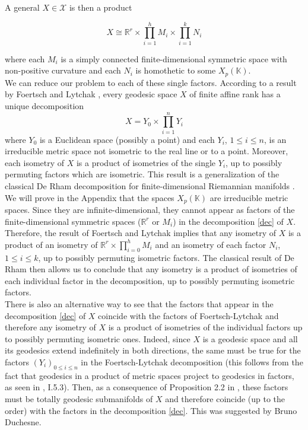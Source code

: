 \documentclass{article}
\theoremstyle{definition}
\theoremstyle{remark}
\theoremstyle{plain}
\begin{document}
A general $X\in\mathcal{X}$ is then a product

\setcounter{equation}{0}
\begin{equation} \label{dec}
    X\cong \mathbb{R}^r\times\prod_{i=1}^{h}{M_i}\times\prod_{i=1}^{k}{N_i}
\end{equation}

where each $M_i$ is a simply connected finite-dimensional symmetric space with non-positive curvature and each $N_i$ is homothetic to some $X_p(\mathbb{K})$. \\

We can reduce our problem to each of these single factors. According to a result by Foertsch and Lytchak \cite{foly}, every geodesic space $X$ of finite affine rank has a unique decomposition $$X=Y_0\times\prod_{i=1}^{n}{Y_i}$$ where $Y_0$ is a Euclidean space (possibly a point) and each $Y_i$, $1\leq i\leq n$, is an irreducible metric space not isometric to the real line or to a point. Moreover, each isometry of $X$ is a product of isometries of the single $Y_i$, up to possibly permuting factors which are isometric. This result is a generalization of the classical De Rham decomposition for finite-dimensional Riemannian manifolds \cite{derham}. \\

We will prove in the Appendix that the spaces $X_p(\mathbb{K})$ are irreducible metric spaces. Since they are infinite-dimensional, they cannot appear as factors of the finite-dimensional symmetric spaces ($\mathbb{R}^r$ or $M_i$) in the decomposition \eqref{dec} of $X$. Therefore, the result of Foertsch and Lytchak implies that any isometry of $X$ is a product of an isometry of $\mathbb{R}^r\times\prod_{i=0}^{h}{M_i}$ and an isometry of each factor $N_i$, $1\leq i\leq k$, up to possibly permuting isometric factors. The classical result of De Rham then allows us to conclude that any isometry is a product of isometries of each individual factor in the decomposition, up to possibly permuting isometric factors. \\

There is also an alternative way to see that the factors that appear in the decomposition \eqref{dec} of $X$ coincide with the factors of Foertsch-Lytchak and therefore any isometry of $X$ is a product of isometries of the individual factors up to possibly permuting isometric ones. Indeed, since $X$ is a geodesic space and all its geodesics extend indefinitely in both directions, the same must be true for the factors $(Y_i)_{0\leq i\leq n}$ in the Foertsch-Lytchak decomposition (this follows from the fact that geodesics in a product of metric spaces project to geodesics in factors, as seen in \cite{bh}, I.5.3). Then, as a consequence of Proposition 2.2 in \cite{duc2023}, these factors must be totally geodesic submanifolds of $X$ and therefore coincide (up to the order) with the factors in the decomposition \eqref{dec}. This was suggested by Bruno Duchesne. \\
\end{document}
